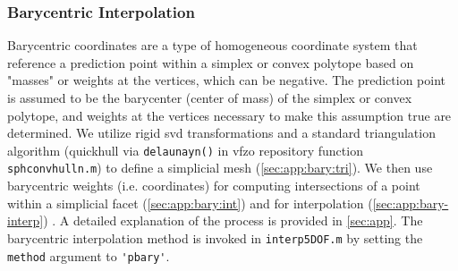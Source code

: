 \documentclass[final,twocolumn,12pt]{elsarticle}
\newcommand{\matlab}[1]{\mbox{\lstinline[style=Matlab-editor]{#1}}}
\newcommand{\outpt}{prediction}
\newcommand{\vfzorepo}{\gls{vfzo} repository}
\begin{document}
\subsubsection{Barycentric Interpolation}
\label{sec:methods:interp:bary}



Barycentric coordinates are a type of homogeneous coordinate system that reference a \outpt{} point within a simplex \cite{langerSphericalBarycentricCoordinates2006} or convex polytope \cite{floaterGeneralizedBarycentricCoordinates2015,meyerGeneralizedBarycentricCoordinates2002,langerSphericalBarycentricCoordinates2006} based on "masses" or weights at the vertices, which can be negative. The \outpt{} point is assumed to be the barycenter (center of mass) of the simplex or convex polytope, and weights at the vertices necessary to make this assumption true are determined. We utilize rigid \gls{svd} transformations and a standard triangulation algorithm (quickhull \cite{barberQuickhullAlgorithmConvex1996} via \matlab{delaunayn()} in \vfzorepo{} function \matlab{sphconvhulln.m}) to define a simplicial mesh (\cref{sec:app:bary:tri}). We then use barycentric weights (i.e. coordinates) for computing intersections of a point within a simplicial facet (\cref{sec:app:bary:int}) and for interpolation (\cref{sec:app:bary-interp}) \cite{langerSphericalBarycentricCoordinates2006}. A detailed explanation of the process is provided in \cref{sec:app}. The barycentric interpolation method is invoked in \matlab{interp5DOF.m} by setting the \matlab{method} argument to \matlab{'pbary'}.

\subsubsection{}
\label{sec:methods:interp:gpr}
\end{document}
